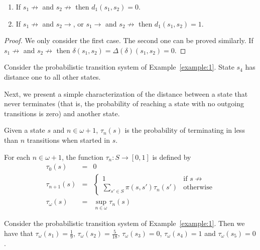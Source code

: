 \documentclass{LMCS}
\begin{document}
\begin{prop}
\label{proposition:A}
\mbox{}
\begin{enumerate}[$\bullet$]
\item
If $s_1 \not\rightarrow$ and $s_2 \not\rightarrow$ then $d_1(s_1, s_2) = 0$.
\item
If $s_1 \not\rightarrow$ and $s_2 \rightarrow$, or $s_1 \rightarrow$ and 
$s_2 \not\rightarrow$ then $d_1(s_1, s_2) = 1$.
\end{enumerate}
\end{prop}
\begin{proof}
We only consider the first case.  The second one can be proved similarly.
If $s_1 \not\rightarrow$ and $s_2 \not\rightarrow$ then
$\delta(s_1, s_2) = \Delta(\delta)(s_1, s_2) = 0$.
\end{proof}

\begin{exa}
Consider the probabilistic transition system of Example~\ref{example:1}.
State $s_4$ has distance one to all other states.
\end{exa}

Next, we present a simple characterization of the distance between a state 
that never terminates (that is, the probability of reaching a state with no 
outgoing transitions is zero) and another state.

Given a state $s$ and $n \in \omega + 1$, $\tau_n(s)$ is the probability
of terminating in less than $n$ transitions when started in $s$.

\begin{defi}
\label{definition:termination}
For each $n \in \omega + 1$, the function $\tau_n : S \to [0, 1]$
is defined by
\begin{displaymath}
\begin{array}{rcl}
\tau_0(s) & = & 0\\
\tau_{n+1}(s) & = & \left \{ 
\begin{array}{ll} 
1 & \mbox{if $s \not\rightarrow$}\\
\sum_{s' \in S} \pi(s, s') \tau_n(s') & \mbox{otherwise}
\end{array} \right . \\ 
\tau_{\omega}(s) & = & \sup_{n \in \omega} \tau_n(s)
\end{array}
\end{displaymath}
\end{defi}

\begin{exa}
Consider the probabilistic transition system of Example~\ref{example:1}.
Then we have that $\tau_{\omega}(s_1) = \frac{1}{9}$, 
$\tau_{\omega}(s_2) = \frac{5}{18}$, $\tau_{\omega}(s_3) = 0$,
$\tau_{\omega}(s_4) = 1$ and $\tau_{\omega}(s_5) = 0$.
\end{exa}
\end{document}
